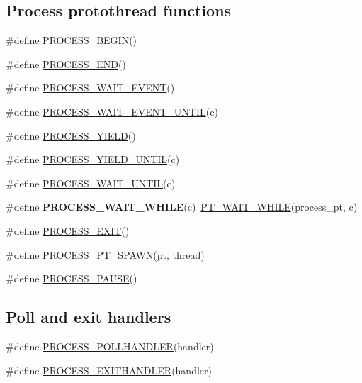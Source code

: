 \subsection*{Process protothread functions}
\begin{DoxyCompactItemize}
\item 
\#define \hyperlink{group__process_ga8efc62947f2ca2c870f52896e0dc1a81}{P\-R\-O\-C\-E\-S\-S\-\_\-\-B\-E\-G\-I\-N}()
\item 
\#define \hyperlink{group__process_ga9c2681a0070eba8a7c9fdf4dbb6db05e}{P\-R\-O\-C\-E\-S\-S\-\_\-\-E\-N\-D}()
\item 
\#define \hyperlink{group__process_ga4f9c1d291e210793e8c4444762f748ba}{P\-R\-O\-C\-E\-S\-S\-\_\-\-W\-A\-I\-T\-\_\-\-E\-V\-E\-N\-T}()
\item 
\#define \hyperlink{group__process_ga996168a0f904c0e28e3f6ed18dddd129}{P\-R\-O\-C\-E\-S\-S\-\_\-\-W\-A\-I\-T\-\_\-\-E\-V\-E\-N\-T\-\_\-\-U\-N\-T\-I\-L}(c)
\item 
\#define \hyperlink{group__process_gad78fc20c14b0b03c3b2412742f5f416f}{P\-R\-O\-C\-E\-S\-S\-\_\-\-Y\-I\-E\-L\-D}()
\item 
\#define \hyperlink{group__process_gae5edd3d10ed29b7a6ed4a42e0690738b}{P\-R\-O\-C\-E\-S\-S\-\_\-\-Y\-I\-E\-L\-D\-\_\-\-U\-N\-T\-I\-L}(c)
\item 
\#define \hyperlink{group__process_ga203e74a64e870015d3c2aa456c1ad5d9}{P\-R\-O\-C\-E\-S\-S\-\_\-\-W\-A\-I\-T\-\_\-\-U\-N\-T\-I\-L}(c)
\item 
\hypertarget{group__process_ga31a4bb7afbf5adac9f43f37469640229}{\#define {\bfseries P\-R\-O\-C\-E\-S\-S\-\_\-\-W\-A\-I\-T\-\_\-\-W\-H\-I\-L\-E}(c)~\hyperlink{group__pt_gaad14bbbf092b90aa0a5a4f9169504a8d}{P\-T\-\_\-\-W\-A\-I\-T\-\_\-\-W\-H\-I\-L\-E}(process\-\_\-pt, c)}\label{group__process_ga31a4bb7afbf5adac9f43f37469640229}

\item 
\#define \hyperlink{group__process_ga479c3ebc58ecef0c027d627433c65862}{P\-R\-O\-C\-E\-S\-S\-\_\-\-E\-X\-I\-T}()
\item 
\#define \hyperlink{group__process_ga8e6d21a11491c5bd2d8017b783da6b29}{P\-R\-O\-C\-E\-S\-S\-\_\-\-P\-T\-\_\-\-S\-P\-A\-W\-N}(\hyperlink{structpt}{pt}, thread)
\item 
\#define \hyperlink{group__process_ga29eb92d7ef01f486d70a90cc34800a5d}{P\-R\-O\-C\-E\-S\-S\-\_\-\-P\-A\-U\-S\-E}()
\end{DoxyCompactItemize}
\subsection*{Poll and exit handlers}
\begin{DoxyCompactItemize}
\item 
\#define \hyperlink{group__process_ga4159c99c908ca521cf8b9fdda4b7f64c}{P\-R\-O\-C\-E\-S\-S\-\_\-\-P\-O\-L\-L\-H\-A\-N\-D\-L\-E\-R}(handler)
\item 
\#define \hyperlink{group__process_ga3dee46e19ad8848b86d9d06321b75c0e}{P\-R\-O\-C\-E\-S\-S\-\_\-\-E\-X\-I\-T\-H\-A\-N\-D\-L\-E\-R}(handler)
\end{DoxyCompactItemize}
